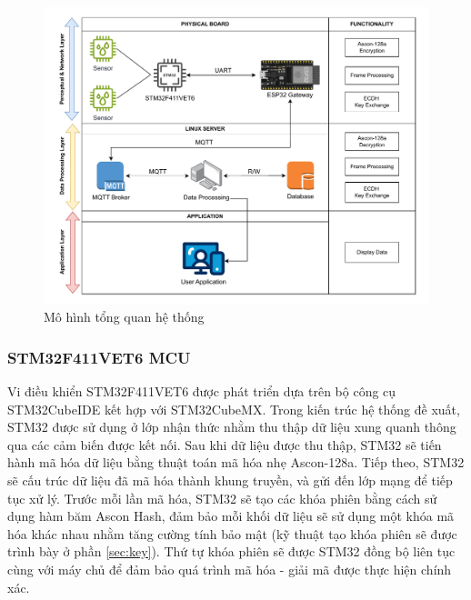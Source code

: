 \begin{figure}[h]
    \centering
    \includegraphics[width=1\linewidth]{realsystem.pdf}
    \caption{Mô hình tổng quan hệ thống}
    \label{fig:realsystem}
\end{figure}

\subsubsection{STM32F411VET6 MCU}
Vi điều khiển STM32F411VET6 được phát triển dựa trên bộ công cụ STM32CubeIDE kết hợp với STM32CubeMX. Trong kiến trúc hệ thống đề xuất, STM32 được sử dụng ở lớp nhận thức nhằm thu thập dữ liệu xung quanh thông qua các cảm biến được kết nối. Sau khi dữ liệu được thu thập, STM32 sẽ tiến hành mã hóa dữ liệu bằng thuật toán mã hóa nhẹ Ascon-128a. Tiếp theo, STM32 sẽ cấu trúc dữ liệu đã mã hóa thành khung truyền, và gửi đến lớp mạng để tiếp tục xử lý. Trước mỗi lần mã hóa, STM32 sẽ tạo các khóa phiên bằng cách sử dụng hàm băm Ascon Hash, đảm bảo mỗi khối dữ liệu sẽ sử dụng một khóa mã hóa khác nhau nhằm tăng cường tính bảo mật (kỹ thuật tạo khóa phiên sẽ được trình bày ở phần \ref{sec:key}). Thứ tự khóa phiên sẽ được STM32 đồng bộ liên tục cùng với máy chủ để đảm bảo quá trình mã hóa - giải mã được thực hiện chính xác.

